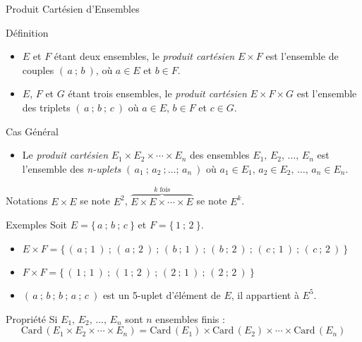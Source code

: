 \documentclass{cours}
\begin{document}
    \begin{Gpartie}{Produit Cartésien d'Ensembles}
        \begin{Spartie}{Définition}
            \begin{itemize}
                \item $E$ et $F$ étant deux ensembles, le \emph{produit cartésien} $E\times F$ est l'ensemble de couples $(\,a~;\,b~)$, où $a\in E$ et $b\in F$.
                \item $E$, $F$ et $G$ étant trois ensembles, le \emph{produit cartésien} $E\times F\times G$ est l'ensemble des triplets $(\,a~;\,b~;\,c~)$ où $a\in E$, $b\in F$ et $c\in G$.
            \end{itemize}
            \begin{SSpartie}{Cas Général}
                \begin{itemize}
                    \item Le \emph{produit cartésien} $E_1\times E_2\times\dotsb\times E_n$ des ensembles $E_1,\,E_2,\,\dotsc,\,E_n$ est l'ensemble des \emph{n-uplets} $(\,a_1~;\,a_2~;\dotsc;\,a_n~)$ où $a_1\in E_1,\,a_2\in E_2,\,\dotsc,\,a_n\in E_n$.
                \end{itemize}
            \end{SSpartie}
        \end{Spartie}
        \begin{Spartie}{Notations}
            $E\times E$ se note $E^2$, $\overbrace{E\times E\times\dotsb\times E}^\text{$k$ fois}$ se note $E^k$.
        \end{Spartie}
        \begin{Spartie}{Exemples}
            Soit $E=\big\{\,a~;\,b~;\,c~\big\}$ et $F=\big\{\,1~;\,2~\big\}$.
            \begin{itemize}
                \item $E\times F=\big\{\,(\,a~;\,1~)~;\,(\,a~;\,2~)~;\,(\,b~;\,1~)~;\,(\,b~;\,2~)~;\,(\,c~;\,1~)~;\,(\,c~;\,2~)~\big\}$
                \item $F\times F=\big\{\,(\,1~;\,1~)~;\,(\,1~;\,2~)~;\,(\,2~;\,1~)~;\,(\,2~;\,2~)~\big\}$
                \item $(\,a~;\,b~;\,b~;\,a~;\,c~)$ est un 5-uplet d'élément de $E$, il appartient à $E^5$.
            \end{itemize}
        \end{Spartie}
        \begin{Spartie}{Propriété}
            Si $E_1,\,E_2,\,\dotsc,\,E_n$ sont $n$ ensembles finis :
            \[\mathrm{Card}\,(E_1\times E_2\times\dotsb\times E_n)=\mathrm{Card}\,(E_1)\times\mathrm{Card}\,(E_2)\times\dotsb\times\mathrm{Card}\,(E_n)\]

\end{Spartie}
\end{Gpartie}
\end{document}
